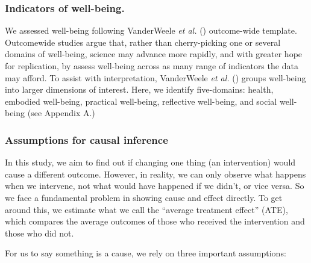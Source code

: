\documentclass[
  singlecolumn,
  9pt]{scrartcl}
\begin{document}
\subsubsection{Indicators of
well-being.}\label{indicators-of-well-being.}

We assessed well-being following VanderWeele \emph{et al.}
() outcome-wide template.
Outcomewide studies argue that, rather than cherry-picking one or
several domains of well-being, science may advance more rapidly, and
with greater hope for replication, by assess well-being across as many
range of indicators the data may afford. To assist with interpretation,
VanderWeele \emph{et al.} () groups
well-being into larger dimensions of interest. Here, we identify
five-domains: health, embodied well-being, practical well-being,
reflective well-being, and social well-being (see Appendix A.)

\subsubsection{Assumptions for causal
inference}\label{assumptions-for-causal-inference}

In this study, we aim to find out if changing one thing (an
intervention) would cause a different outcome. However, in reality, we
can only observe what happens when we intervene, not what would have
happened if we didn't, or vice versa. So we face a fundamental problem
in showing cause and effect directly. To get around this, we estimate
what we call the ``average treatment effect'' (ATE), which compares the
average outcomes of those who received the intervention and those who
did not.

For us to say something is a cause, we rely on three important
assumptions:
\end{document}
